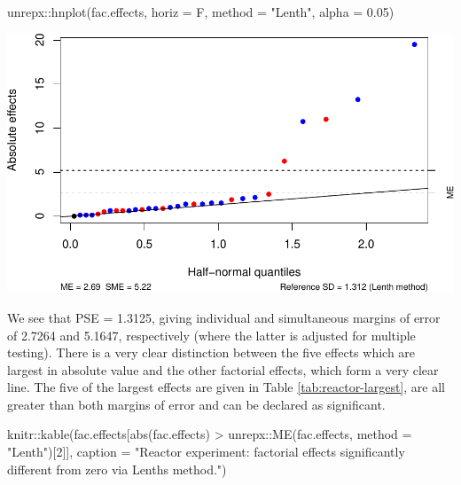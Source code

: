 \documentclass[
]{book}
\newenvironment{Shaded}{\begin{snugshade}}{\end{snugshade}}
\newcommand{\AttributeTok}[1]{\textcolor[rgb]{0.77,0.63,0.00}{#1}}
\newcommand{\DecValTok}[1]{\textcolor[rgb]{0.00,0.00,0.81}{#1}}
\newcommand{\FloatTok}[1]{\textcolor[rgb]{0.00,0.00,0.81}{#1}}
\newcommand{\FunctionTok}[1]{\textcolor[rgb]{0.00,0.00,0.00}{#1}}
\newcommand{\NormalTok}[1]{#1}
\newcommand{\SpecialCharTok}[1]{\textcolor[rgb]{0.00,0.00,0.00}{#1}}
\newcommand{\StringTok}[1]{\textcolor[rgb]{0.31,0.60,0.02}{#1}}
\theoremstyle{definition}
\theoremstyle{definition}
\theoremstyle{definition}
\theoremstyle{definition}
\theoremstyle{remark}
\begin{document}
\begin{Shaded}
\begin{Highlighting}[]
\NormalTok{unrepx}\SpecialCharTok{::}\FunctionTok{hnplot}\NormalTok{(fac.effects, }\AttributeTok{horiz =}\NormalTok{ F, }\AttributeTok{method =} \StringTok{"Lenth"}\NormalTok{, }\AttributeTok{alpha =} \FloatTok{0.05}\NormalTok{)}
\end{Highlighting}
\end{Shaded}

\includegraphics{bookdown_math3014-6027_files/figure-latex/reactor-lenth-1.pdf}

We see that PSE = 1.3125, giving individual and simultaneous margins of error of 2.7264 and 5.1647, respectively (where the latter is adjusted for multiple testing). There is a very clear distinction between the five effects which are largest in absolute value and the other factorial effects, which form a very clear line. The five of the largest effects are given in Table \ref{tab:reactor-largest}, are all greater than both margins of error and can be declared as significant.

\begin{Shaded}
\begin{Highlighting}[]
\NormalTok{knitr}\SpecialCharTok{::}\FunctionTok{kable}\NormalTok{(fac.effects[}\FunctionTok{abs}\NormalTok{(fac.effects) }\SpecialCharTok{\textgreater{}}\NormalTok{ unrepx}\SpecialCharTok{::}\FunctionTok{ME}\NormalTok{(fac.effects, }
                                                       \AttributeTok{method =} \StringTok{"Lenth"}\NormalTok{)[}\DecValTok{2}\NormalTok{]],}
             \AttributeTok{caption =} \StringTok{"Reactor experiment: factorial effects significantly different from zero via Lenth\textquotesingle{}s method."}\NormalTok{)}
\end{Highlighting}
\end{Shaded}
\end{document}
